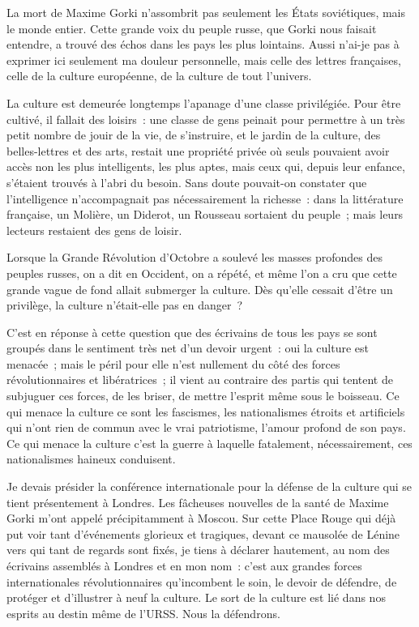 \documentclass[twoside]{book} %
\begin{document}
\noindent La mort de Maxime Gorki n’assombrit pas seulement les États soviétiques, mais le monde entier. Cette grande voix du peuple russe, que Gorki nous faisait entendre, a trouvé des échos dans les pays les plus lointains. Aussi n’ai-je pas à exprimer ici seulement ma douleur personnelle, mais celle des lettres françaises, celle de la culture européenne, de la culture de tout l’univers.\par
La culture est demeurée longtemps l’apanage d’une classe privilégiée. Pour être cultivé, il fallait des loisirs : une classe de gens peinait pour permettre à un très petit nombre de jouir de la vie, de s’instruire, et le jardin de la culture, des belles-lettres et des arts, restait une propriété privée où seuls pouvaient avoir accès non les plus intelligents, les plus aptes, mais ceux qui, depuis leur enfance, s’étaient trouvés à l’abri du besoin. Sans doute pouvait-on constater que l’intelligence n’accompagnait pas nécessairement la richesse : dans la littérature française, un Molière, un Diderot, un Rousseau sortaient du peuple ; mais leurs lecteurs restaient des gens de loisir.\par
Lorsque la Grande Révolution d’Octobre a soulevé les masses profondes des peuples russes, on a dit en Occident, on a répété, et même l’on a cru que cette grande vague de fond allait submerger la culture. Dès qu’elle cessait d’être un privilège, la culture n’était-elle pas en danger ?\par
C’est en réponse à cette question que des écrivains de tous les pays se sont groupés dans le sentiment très net d’un devoir urgent : oui la culture est menacée ; mais le péril pour elle n’est nullement du côté des forces révolutionnaires et libératrices ; il vient au contraire des partis qui tentent de subjuguer ces forces, de les briser, de mettre l’esprit même sous le boisseau. Ce qui menace la culture ce sont les fascismes, les nationalismes étroits et artificiels qui n’ont rien de commun avec le vrai patriotisme, l’amour profond de son pays. Ce qui menace la culture c’est la guerre à laquelle fatalement, nécessairement, ces nationalismes haineux conduisent.\par
Je devais présider la conférence internationale pour la défense de la culture qui se tient présentement à Londres. Les fâcheuses nouvelles de la santé de Maxime Gorki m’ont appelé précipitamment à Moscou. Sur cette Place Rouge qui déjà put voir tant d’événements glorieux et tragiques, devant ce mausolée de Lénine vers qui tant de regards sont fixés, je tiens à déclarer hautement, au nom des écrivains assemblés à Londres et en mon nom : c’est aux grandes forces internationales révolutionnaires qu’incombent le soin, le devoir de défendre, de protéger et d’illustrer à neuf la culture. Le sort de la culture est lié dans nos esprits au destin même de l’URSS. Nous la défendrons.\par
\end{document}
